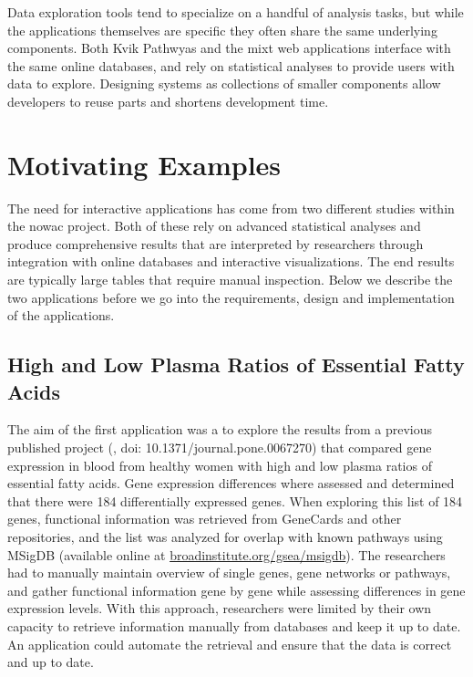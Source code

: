 Data exploration tools tend to specialize on a handful of analysis tasks, but
while the applications themselves are specific they often share the same
underlying components. Both Kvik Pathwyas and the \gls{mixt} web
applications interface with the same online databases, and rely on statistical
analyses to provide users with data to explore. Designing systems as collections
of smaller components allow developers to reuse parts and shortens development
time. 

\section{Motivating Examples}
The need for interactive applications has come from two different studies
within the \gls{nowac} project. Both of these rely on advanced statistical
analyses and produce comprehensive results that are interpreted by researchers
through integration with online databases and interactive visualizations. The
end results are typically large tables that require manual inspection. Below we
describe the two applications before we go into the requirements, design and
implementation of the applications. 

\subsection{High and Low Plasma Ratios of Essential Fatty Acids} 
The aim of the first application was a to explore the
results from a previous published project (\cite{olsen2013plasma}, doi:
10.1371/journal.pone.0067270) that compared gene expression in blood from
healthy women with high and low plasma ratios of essential fatty acids. Gene
expression differences where assessed and determined that there were 184
differentially expressed genes. When exploring this list of 184 genes,
functional information was retrieved from GeneCards and other repositories, and
the list was analyzed for overlap with known pathways using MSigDB (available
online at
\href{broadinstitute.org/gsea/msigdb}{broadinstitute.org/gsea/msigdb}). The
researchers had to manually maintain overview of single genes, gene networks or
pathways, and gather functional information gene by gene while assessing
differences in gene expression levels. With this approach, researchers were
limited by their own capacity to retrieve information manually from databases
and keep it up to date. An application could automate the retrieval and ensure
that the data is correct and up to date. 

